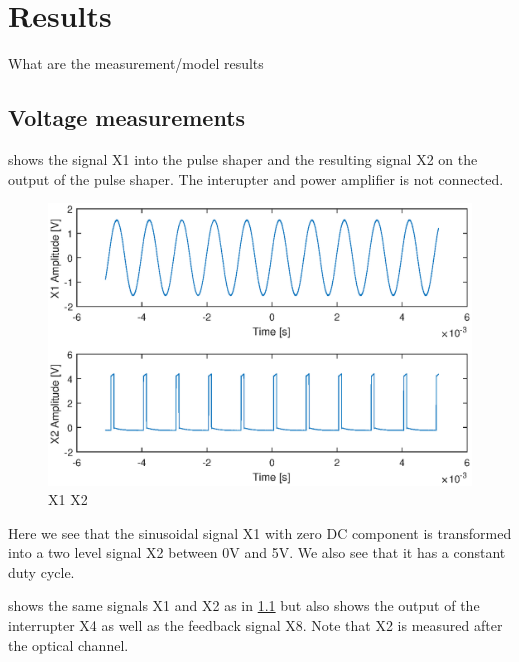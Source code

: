 \chapter{Results}
What are the measurement/model results

\section{Voltage measurements}

 shows the signal X1 into the pulse shaper and the resulting signal X2 on the output of the pulse shaper. The interupter and power amplifier is not connected.

\begin{figure}[H]
    \centering
    \includegraphics[trim={1cm 0cm 1cm 0cm},clip,width=\textwidth]{img/X1-X2.eps}
    \caption{X1 X2}
    \label{fig:m_x1-x2}
\end{figure}

Here we see that the sinusoidal signal X1 with zero DC component is transformed into a two level signal X2 between 0V and 5V. We also see that it has a constant duty cycle.

 shows the same signals X1 and X2 as in \cref{fig:m_x1-x2} but also shows the output of the interrupter X4 as well as the feedback signal X8. Note that X2 is measured after the optical channel.

